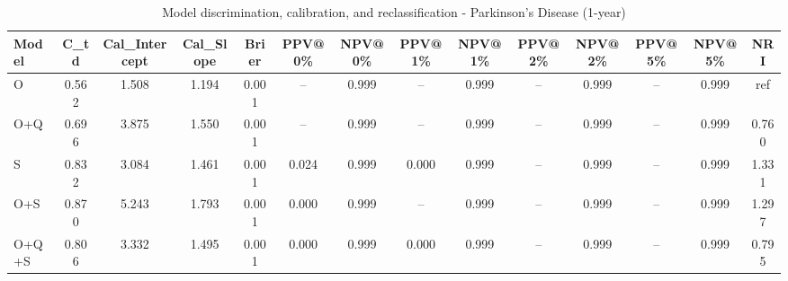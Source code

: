 \begin{table}[htbp]
\centering
\small
\caption{Model discrimination, calibration, and reclassification - Parkinson's Disease (1-year)}
\label{tab:perf_pd_1y}
\begin{tabular}{lccccccccccccc}
\toprule
Model & C\_td & Cal\_Intercept & Cal\_Slope & Brier & PPV@0\% & NPV@0\% & PPV@1\% & NPV@1\% & PPV@2\% & NPV@2\% & PPV@5\% & NPV@5\% & NRI \\
\midrule
O & 0.562 & 1.508 & 1.194 & 0.001 & -- & 0.999 & -- & 0.999 & -- & 0.999 & -- & 0.999 & ref \\
O+Q & 0.696 & 3.875 & 1.550 & 0.001 & -- & 0.999 & -- & 0.999 & -- & 0.999 & -- & 0.999 & 0.760 \\
S & 0.832 & 3.084 & 1.461 & 0.001 & 0.024 & 0.999 & 0.000 & 0.999 & -- & 0.999 & -- & 0.999 & 1.331 \\
O+S & 0.870 & 5.243 & 1.793 & 0.001 & 0.000 & 0.999 & -- & 0.999 & -- & 0.999 & -- & 0.999 & 1.297 \\
O+Q+S & 0.806 & 3.332 & 1.495 & 0.001 & 0.000 & 0.999 & 0.000 & 0.999 & -- & 0.999 & -- & 0.999 & 0.795 \\
\bottomrule
\end{tabular}
\end{table}